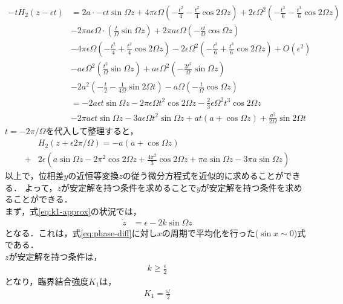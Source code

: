 \documentclass[../main]{subfiles}
\begin{document}
    \begin{align*}
        -tH_2(z-\epsilon t)&=2a\cdot -\epsilon t\sin\Omega z+4\pi\epsilon\Omega\left( -\frac{t^2}{4} -\frac{t^2}{4}\cos 2\Omega z\right)+2\epsilon\Omega^2\left( -\frac{t^3}{6} -\frac{t^3}{6}\cos 2\Omega z\right)\\
        &-2\pi a\epsilon\Omega\cdot\left(\frac{t}{\Omega}\sin\Omega z\right)+2\pi a\epsilon\Omega\left(-\frac{\epsilon t}{\Omega}\cos\Omega z\right)\\
        &-4\pi\epsilon\Omega\left(-\frac{t^2}{4}+\frac{t^2}{4}\cos 2\Omega z\right)-2\epsilon\Omega^2\left( -\frac{t^3}{6} +\frac{t^3}{6}\cos 2\Omega z\right)+O(\epsilon^2)\\
        &-a\epsilon\Omega^2\left( \frac{t^2}{\Omega}\sin\Omega z \right)+a\epsilon\Omega^2\left( -\frac{2t^2}{\Omega}\sin\Omega z \right)\\
        &-2a^2\left( -\frac{t}{2}-\frac{1}{4\Omega} \sin 2\Omega t\right)-a\Omega \left( -\frac{t}{\Omega} \cos\Omega z\right)\\
        &=-2a\epsilon t\sin\Omega z-2\pi\epsilon\Omega t^2\cos 2\Omega z-\frac{2}{3}\epsilon\Omega^2t^3\cos 2\Omega z\\
        &-2\pi a\epsilon t\sin\Omega z-3a\epsilon\Omega t^2\sin\Omega z+at(a+\cos\Omega z)+\frac{a^2}{2\Omega}\sin 2\Omega t
    \end{align*}
    $t=-2\pi/\Omega$を代入して整理すると，
    \begin{align*}
        &H_2(z+\epsilon 2\pi/\Omega)=-a(a+\cos\Omega z)\\
        +&2\epsilon\left( a\sin\Omega z-2\pi^2\cos2\Omega z+\frac{4\pi^2}{3} \cos 2\Omega z+\pi a\sin\Omega z-3\pi a\sin\Omega z\right)
    \end{align*}
    以上で，位相差$y$の近恒等変換$z$の従う微分方程式を近似的に求めることができる．
    よって，$z$が安定解を持つ条件を求めることで$y$が安定解を持つ条件を求めることができる．\\
    まず，式\eqref{eq:k1-approx}の状況では，
    \begin{align*}
        \dot{z}&=\epsilon-2k\sin\Omega z
    \end{align*}
    となる．これは，式\eqref{eq:phase-diff}に対し$x$の周期で平均化を行った($\sin x\sim 0$)式である．\\
    $z$が安定解を持つ条件は，
    \begin{align*}
        k\geq\frac{\epsilon}{2}
    \end{align*}
    となり，臨界結合強度$K_1$は，
    \begin{align*}
        K_1=\frac{\omega}{2}
    \end{align*}
\end{document}
